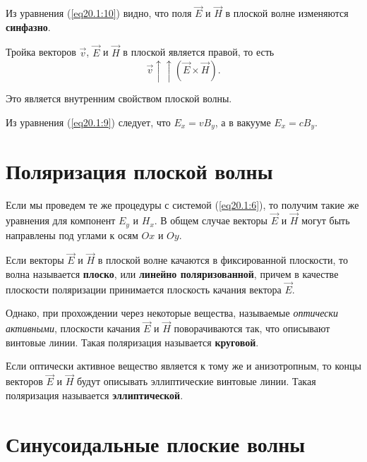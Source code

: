 	\begin{conclusion}
        Из уравнения \textnormal{(\ref{eq20.1:10})} видно, что поля
        \( \vec{E} \) и \( \vec{H} \) в плоской волне изменяются
        \textbf{синфазно}.
	\end{conclusion}
	
	\begin{conclusion}
        Тройка векторов \( \vec{v} \), \( \vec{E} \) и \( \vec{H} \) в плоской
        является правой, то есть
        \[
            \vec{v} \uparrow\uparrow (\vec{E}\times\vec{H}).
        \]
        
        Это является внутренним свойством плоской волны.
	\end{conclusion}
	
	\begin{remark}
	    Из уравнения (\ref{eq20.1:9}) следует, что \( E_x = vB_y \), а в вакууме
        \( E_x = cB_y \).
	\end{remark}

\section{Поляризация плоской волны}

	Если мы проведем те же процедуры с системой (\ref{eq20.1:6}), то получим
    такие же уравнения для компонент \( E_y \) и \( H_x \). В общем случае
    векторы \( \vec{E} \) и \( \vec{H} \) могут быть направлены под углами к
    осям \( Ox \) и \( Oy \).
	
	\begin{definition}
        Если векторы \( \vec{E} \) и \( \vec{H} \) в плоской волне качаются в
        фиксированной плоскости, то волна называется \textbf{плоско}, или
        \textbf{линейно поляризованной}, причем в качестве плоскости поляризации
        принимается плоскость качания вектора \( \vec{E} \).
	\end{definition}
	
	Однако, при прохождении через некоторые вещества, называемые
    \textit{оптически активными}, плоскости качания \( \vec{E} \) и
    \( \vec{H} \) поворачиваются так, что описывают винтовые линии. Такая
    поляризация называется \textbf{круговой}.
	
	Если оптически активное вещество является к тому же и анизотропным, то концы
    векторов \( \vec{E} \) и \( \vec{H} \) будут описывать эллиптические
    винтовые линии. Такая поляризация называется \textbf{эллиптической}.
	
\section{Синусоидальные плоские волны}

